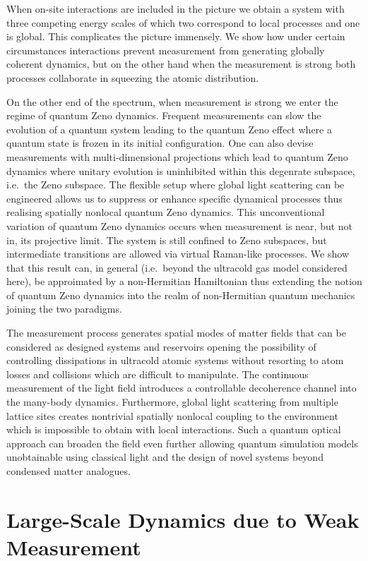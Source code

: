 When on-site interactions are included in the picture we obtain a
system with three competing energy scales of which two correspond to
local processes and one is global. This complicates the picture
immensely. We show how under certain circumstances interactions
prevent measurement from generating globally coherent dynamics, but on
the other hand when the measurement is strong both processes
collaborate in squeezing the atomic distribution.

On the other end of the spectrum, when measurement is strong we enter
the regime of quantum Zeno dynamics. Frequent measurements can slow
the evolution of a quantum system leading to the quantum Zeno effect
where a quantum state is frozen in its initial configuration. One can
also devise measurements with multi-dimensional projections which lead
to quantum Zeno dynamics where unitary evolution is uninhibited within
this degenrate subspace, i.e.~the Zeno subspace. The flexible setup
where global light scattering can be engineered allows us to suppress
or enhance specific dynamical processes thus realising spatially
nonlocal quantum Zeno dynamics. This unconventional variation of
quantum Zeno dynamics occurs when measurement is near, but not in, its
projective limit. The system is still confined to Zeno subspaces, but
intermediate transitions are allowed via virtual Raman-like
processes. We show that this result can, in general (i.e.~beyond the
ultracold gas model considered here), be approimated by a
non-Hermitian Hamiltonian thus extending the notion of quantum Zeno
dynamics into the realm of non-Hermitian quantum mechanics joining the
two paradigms.

The measurement process generates spatial modes of matter fields that
can be considered as designed systems and reservoirs opening the
possibility of controlling dissipations in ultracold atomic systems
without resorting to atom losses and collisions which are difficult to
manipulate. The continuous measurement of the light field introduces a
controllable decoherence channel into the many-body
dynamics. Furthermore, global light scattering from multiple lattice
sites creates nontrivial spatially nonlocal coupling to the
environment which is impossible to obtain with local
interactions. Such a quantum optical approach can broaden the field
even further allowing quantum simulation models unobtainable using
classical light and the design of novel systems beyond condensed
matter analogues.

\section{Large-Scale Dynamics due to Weak Measurement}

